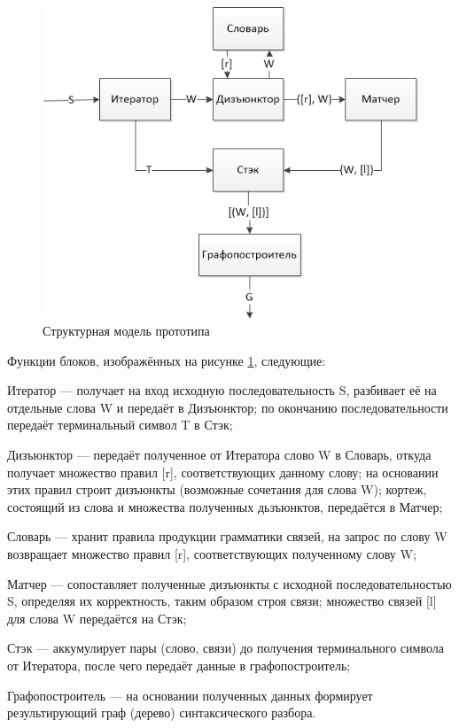 \begin{figure}[H]
	\centering
		\includegraphics[scale=1.0]{images/structure_initial.png}
	\caption{\small Структурная модель прототипа}
	\label{fig:prototype_struct}
\end{figure}

Функции блоков, изображённых на рисунке \ref{fig:prototype_struct}, следующие:
\begin{list}{}{\leftmargin=1.5cm}
	\item Итератор --- получает на вход исходную последовательность S, разбивает её на отдельные слова W и передаёт в Дизъюнктор; по окончанию последовательности передаёт терминальный символ T в Стэк;
	\item Дизъюнктор --- передаёт полученное от Итератора слово W в Словарь, откуда получает множество правил [r], соответствующих данному слову; на основании этих правил строит дизъюнкты (возможные сочетания для слова W); кортеж, состоящий из слова и множества полученных дьзъюнктов, передаётся в Матчер;
	\item Словарь --- хранит правила продукции грамматики связей, на запрос по слову W возвращает множество правил [r], соответствующих полученному слову W;
	\item Матчер --- сопоставляет полученные дизъюнкты с исходной последовательностью S, определяя их корректность, таким образом строя связи; множество связей [l] для слова W передаётся на Стэк;
	\item Стэк --- аккумулирует пары (слово, связи) до получения терминального символа от Итератора, после чего передаёт данные в графопостроитель;
	\item Графопостроитель --- на основании полученных данных формирует результирующий граф (дерево) синтаксического разбора.
\end{list}

